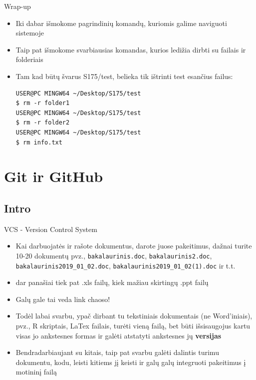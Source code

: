 \documentclass[11pt,xcolor=table]{beamer}
\begin{document}
\begin{frame}[fragile]{Wrap-up}
\begin{itemize}
\item Iki dabar išmokome pagrindinių komandų, kuriomis galime naviguoti sistemoje
\item Taip pat išmokome svarbiausias komandas, kurios ledižia dirbti su failais ir folderiais
\item Tam kad būtų švarus S175/test, belieka tik ištrinti test esančius failus: 
\begin{lstlisting}
USER@PC MINGW64 ~/Desktop/S175/test
$ rm -r folder1
USER@PC MINGW64 ~/Desktop/S175/test
$ rm -r folder2
USER@PC MINGW64 ~/Desktop/S175/test
$ rm info.txt
\end{lstlisting}
\end{itemize}
\end{frame}


\section{Git ir GitHub}

\subsection{Intro}
\begin{frame}{VCS - Version Control System}
\begin{itemize}
\item Kai darbuojatės ir rašote dokumentus, darote juose pakeitimus, dažnai turite 10-20 dokumentų pvz., \colorbox{listinggray}{\lstinline|bakalaurinis.doc|}, \colorbox{listinggray}{\lstinline|bakalaurinis2.doc|}, \colorbox{listinggray}{\lstinline|bakalaurinis2019_01_02.doc|}, \colorbox{listinggray}{\lstinline|bakalaurinis2019_01_02(1).doc|} ir t.t. 
\item dar panašiai tiek pat .xls failų, kiek mažiau skirtingų .ppt failų
\item Galų gale tai veda link chaoso!
\item Todėl labai svarbu, ypač dirbant tu tekstiniais dokumentais (ne Word'iniais), pvz., R skriptais, LaTex failais, turėti vieną failą, bet būti išsisaugojus kartu visas jo ankstesnes formas ir galėti atstatyti ankstesnes jų \textbf{versijas}
\item Bendradarbiaujant su kitais, taip pat svarbu galėti dalintis turimu dokumentu, kodu, leisti kitiems jį keisti ir galų galų integruoti pakeitimus į motininį failą
\end{itemize}
\end{frame}
\end{document}
